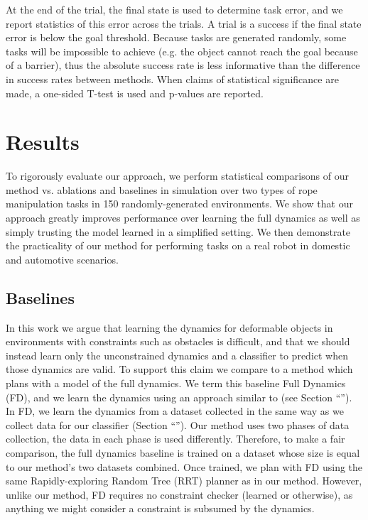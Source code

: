 At the end of the trial, the final state is used to determine task error, and we report statistics of this error across the trials. A trial is a success if the final state error is below the goal threshold. Because tasks are generated randomly, some tasks will be impossible to achieve (e.g. the object cannot reach the goal because of a barrier), thus the absolute success rate is less informative than the difference in success rates between methods. When claims of statistical significance are made, a one-sided T-test is used and p-values are reported.

\section{Results}

To rigorously evaluate our approach, we perform statistical comparisons of our method vs. ablations and baselines in simulation over two types of rope manipulation tasks in 150 randomly-generated environments. We show that our approach greatly improves performance over learning the full dynamics as well as simply trusting the model learned in a simplified setting. We then demonstrate the practicality of our method for performing tasks on a real robot in domestic and automotive scenarios.

\subsection{Baselines}

In this work we argue that learning the dynamics for deformable objects in environments with constraints such as obstacles is difficult, and that we should instead learn only the unconstrained dynamics and a classifier to predict when those dynamics are valid. To support this claim we compare to a method which plans with a model of the full dynamics. We term this baseline Full Dynamics (FD), and we learn the dynamics using an approach similar to \cite{Nagabandi2018} (see Section ``''). In FD, we learn the dynamics from a dataset collected in the same way as we collect data for our classifier (Section ``''). Our method uses two phases of data collection, the data in each phase is used differently. Therefore, to make a fair comparison, the full dynamics baseline is trained on a dataset whose size is equal to our method's two datasets combined. Once trained, we plan with FD using the same Rapidly-exploring Random Tree (RRT) planner as in our method. However, unlike our method, FD requires no constraint checker (learned or otherwise), as anything we might consider a constraint is subsumed by the dynamics.

